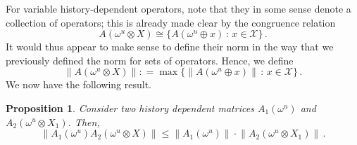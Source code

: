 \documentclass[a4paper,reqno]{amsart}
\newtheorem{proposition}[theorem]{Proposition}
\newcommand{\states}{\mathcal{X}}
\newcommand{\norm}[1]{\left\lVert #1 \right\rVert}
\newcommand{\coloneqq}{:\!=}
\begin{document}
For variable history-dependent operators, note that they in some sense denote a collection of operators; this is already made clear by the congruence relation
\begin{equation*}
A(\omega^u\otimes X) \cong \bigl\{A(\omega^u\oplus x)\,:\,x\in\states\bigr\}\,.
\end{equation*}
It would thus appear to make sense to define their norm in the way that we previously defined the norm for sets of operators. Hence, we define
\begin{equation*}
\norm{A(\omega^u\otimes X)} \coloneqq \max\bigl\{\norm{A(\omega^u\oplus x)}\,:\,x\in\states\bigr\}\,.
\end{equation*}
We now have the following result.
\begin{proposition}
Consider two history dependent matrices $A_1(\omega^u)$ and $A_2(\omega^u\otimes X_1)$. Then,
\begin{equation*}
\norm{A_1(\omega^u)A_2(\omega^u\otimes X)} \leq \norm{A_1(\omega^u)}\cdot\norm{A_2(\omega^u\otimes X_1)}\,.
\end{equation*}
\end{proposition}
\end{document}
